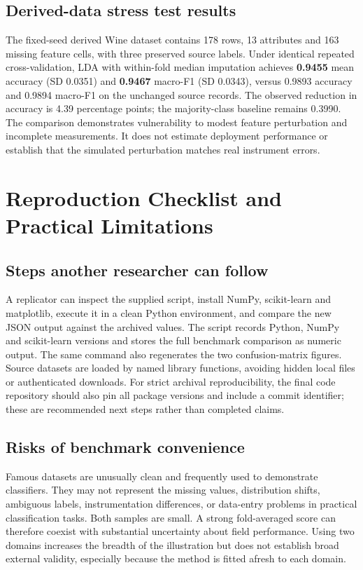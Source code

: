 \documentclass[11pt]{article}
\begin{document}
\subsection{Derived-data stress test results}
The fixed-seed derived Wine dataset contains 178 rows, 13 attributes and 163 missing feature cells, with three preserved source labels. Under identical repeated cross-validation, LDA with within-fold median imputation achieves \textbf{0.9455} mean accuracy (SD 0.0351) and \textbf{0.9467} macro-F1 (SD 0.0343), versus 0.9893 accuracy and 0.9894 macro-F1 on the unchanged source records. The observed reduction in accuracy is 4.39 percentage points; the majority-class baseline remains 0.3990. The comparison demonstrates vulnerability to modest feature perturbation and incomplete measurements. It does not estimate deployment performance or establish that the simulated perturbation matches real instrument errors.

\section{Reproduction Checklist and Practical Limitations}
\subsection{Steps another researcher can follow}
A replicator can inspect the supplied script, install NumPy, scikit-learn and matplotlib, execute it in a clean Python environment, and compare the new JSON output against the archived values. The script records Python, NumPy and scikit-learn versions and stores the full benchmark comparison as numeric output. The same command also regenerates the two confusion-matrix figures. Source datasets are loaded by named library functions, avoiding hidden local files or authenticated downloads. For strict archival reproducibility, the final code repository should also pin all package versions and include a commit identifier; these are recommended next steps rather than completed claims.

\subsection{Risks of benchmark convenience}
Famous datasets are unusually clean and frequently used to demonstrate classifiers. They may not represent the missing values, distribution shifts, ambiguous labels, instrumentation differences, or data-entry problems in practical classification tasks. Both samples are small. A strong fold-averaged score can therefore coexist with substantial uncertainty about field performance. Using two domains increases the breadth of the illustration but does not establish broad external validity, especially because the method is fitted afresh to each domain.
\end{document}

